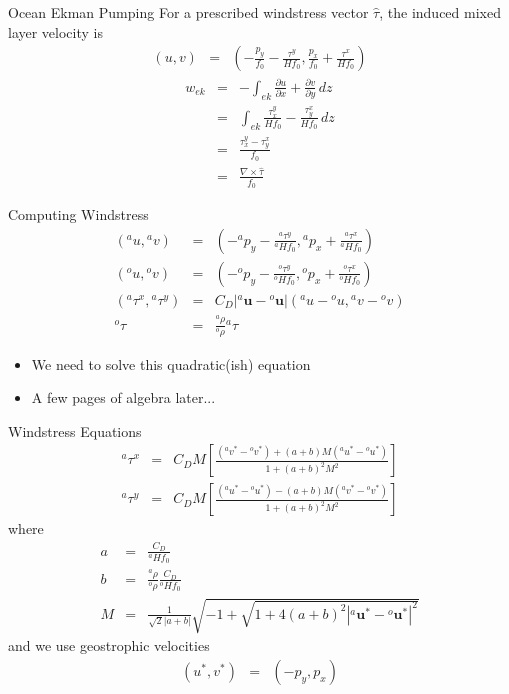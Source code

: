 \documentclass[a4paper]{beamer}
\begin{document}
\begin{frame}{Ocean Ekman Pumping}
For a prescribed windstress vector $\hat\tau$, the induced mixed layer velocity is
\begin{eqnarray}
(u, v) & = & \left(-\frac{p_y}{f_0} - \frac{\tau^y}{Hf_0}, \frac{p_x}{f_0} + \frac{\tau^x}{Hf_0}\right)
\end{eqnarray}
\begin{eqnarray}
w_{ek} & = & -\int_{ek} \frac{\partial u}{\partial x} + \frac{\partial v}{\partial y}\,dz\\
       & = &  \int_{ek} \frac{\tau_x^y}{Hf_0} - \frac{\tau_y^x}{Hf_0}\,dz\\
       & = & \frac{\tau_x^y - \tau_y^x}{f_0}\\
       & = & \frac{\nabla \times \hat\tau}{f_0}
\end{eqnarray}
\end{frame}

\begin{frame}{Computing Windstress}
\begin{eqnarray}
\left({}^au, {}^av\right) & = & \left(-{}^ap_y - \frac{{}^a\tau^y}{{}^aHf_0}, {}^ap_x + \frac{{}^a\tau^x}{{}^aHf_0}\right)\\
\left({}^ou, {}^ov\right) & = & \left(-{}^op_y - \frac{{}^o\tau^y}{{}^oHf_0}, {}^op_x + \frac{{}^o\tau^x}{{}^oHf_0}\right)\\
\left({}^a\tau^x, {}^a\tau^y\right) & = & C_D\left|{}^a\mathbf{u} - {}^o\mathbf{u}\right|\left({}^au - {}^ou, {}^av - {}^ov \right)\\
{}^o\tau & = & \frac{{}^a\rho}{{}^o\rho}{}^a\tau
\end{eqnarray}
\begin{itemize}
\item We need to solve this quadratic(ish) equation
\item A few pages of algebra later...
\end{itemize}
\end{frame}

\begin{frame}{Windstress Equations}
\begin{eqnarray}
{}^a\tau^x & = & C_DM\left[\frac{({}^av^* - {}^ov^*) + (a + b)M({}^au^* - {}^ou^*)}{1 + (a + b)^2M^2}\right]\\
{}^a\tau^y & = & C_DM\left[\frac{({}^au^* - {}^ou^*) - (a + b)M({}^av^* - {}^ov^*)}{1 + (a + b)^2M^2}\right]
\end{eqnarray}
where
\begin{eqnarray}
a & = & \frac{C_D}{{}^aHf_0}\\
b & = & \frac{{}^a\rho}{{}^o\rho}\frac{C_D}{{}^oHf_0}\\
M & = & \frac{1}{\sqrt{2}|a + b|}\sqrt{-1 + \sqrt{1 + 4(a + b)^2|{}^a\mathbf{u^*} - {}^o\mathbf{u^*}|^2}}
\end{eqnarray}
and we use geostrophic velocities
\begin{eqnarray}
(u^*, v^*) & = & (-p_y, p_x)
\end{eqnarray}
\end{frame}
\end{document}
